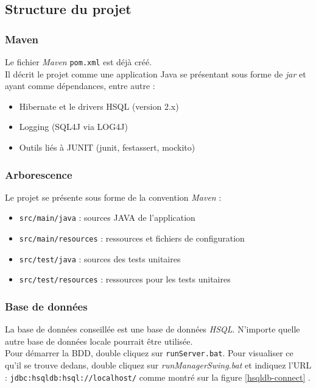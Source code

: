 \documentclass[small,algo]{dushClass}
\begin{document}
\subsection{Structure du projet}

\subsubsection{Maven}

Le fichier \emph{Maven} \texttt{pom.xml} est déjà créé.\\

Il décrit le projet comme une application Java se présentant sous forme de \emph{jar} et ayant comme dépendances, entre autre :
\begin{itemize}
\item Hibernate et le drivers HSQL (version 2.x)
\item Logging (SQL4J via LOG4J)
\item Outils liés à JUNIT (junit, festassert, mockito)
\end{itemize}

\subsubsection{Arborescence}

Le projet se présente sous forme de la convention \emph{Maven} :
\begin{itemize}
\item \texttt{src/main/java} : sources JAVA de l'application
\item \texttt{src/main/resources} : ressources et fichiers de configuration
\item \texttt{src/test/java} : sources des tests unitaires
\item \texttt{src/test/resources} : ressources pour les tests unitaires
\end{itemize}

\subsubsection{Base de données}

La base de données conseillée est une base de données \emph{HSQL}. N'importe quelle autre base de données locale pourrait être utilisée.\\

Pour démarrer la BDD, double cliquez sur \texttt{runServer.bat}. Pour visualiser ce qu'il se trouve dedans, double cliquez sur \emph{runManagerSwing.bat} et indiquez l'URL : \texttt{jdbc:hsqldb:hsql://localhost/} comme montré sur la figure \ref{hsqldb-connect} .\\
\end{document}
